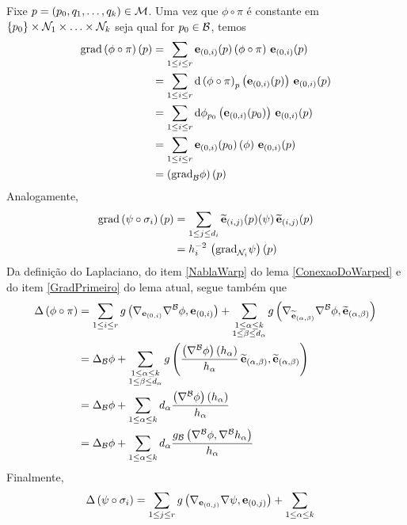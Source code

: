 \begin{demm}
Fixe $p = \left( p_0, q_1, \ldots, q_k  \right) \in \mathcal{M}$. Uma vez que $\phi \circ \pi$ é constante em $\{p_0 \} \times \mathcal{N}_1 \times \ldots \times \mathcal{N}_k$ seja qual for $p_0 \in \mathcal{B}$, temos
\begin{align*}
\text{grad}\left( \phi \circ \pi \right)(p) &= \sum_{1 \leq i \leq r} \mathbf{e}_{(0, i)}(p) \left( \phi \circ \pi \right) \, \mathbf{e}_{(0, i)}(p) \\
&= \sum_{1 \leq i \leq r} \mathrm{d} \left( \phi \circ \pi \right)_p \left( \mathbf{e}_{(0, i)}(p) \right) \, \mathbf{e}_{(0, i)}(p) \\
&=  \sum_{1 \leq i \leq r} \mathrm{d} \phi_{p_0}\left( \mathbf{e}_{(0, i)}(p_0) \right)  \, \mathbf{e}_{(0, i)}(p) \\ 
&=  \sum_{1 \leq i \leq r}  \mathbf{e}_{(0, i)}(p_0) \left( \phi \right) \, \mathbf{e}_{(0, i)}(p) \\
&= \left( \text{grad}_{\mathcal{B}} \phi \right) (p)
\end{align*}
Analogamente,
\begin{align*}
\text{grad}\left( \psi \circ \sigma_i \right)(p) &= \sum_{1 \leq j \leq d_i} \widetilde{\mathbf{e}}_{(i, j)}(p)(\psi) \, \widetilde{\mathbf{e}}_{(i, j)}(p) \\
&= h_{i}^{-2} \, \left( \text{grad}_{\mathcal{N}_i} \psi \right)(p)
\end{align*}
Da definição do Laplaciano, do item \ref{NablaWarp} do lema \cref{ConexaoDoWarped} e do item \ref{GradPrimeiro} do lema atual, segue também que
\begin{align*}
\Delta\left( \phi \circ \pi \right) &= \sum_{1 \leq i \leq r} g\left(  \nabla_{\mathbf{e}_{(0, i)}} \nabla^{\mathcal{B}} \phi, \mathbf{e}_{(0, i)}  \right) + \sum_{\substack{1 \leq \alpha \leq k \\
1 \leq \beta \leq d_{\alpha}}} g\left(  \nabla_{\widetilde{\mathbf{e}}_{(\alpha, \beta)}} \nabla^{\mathcal{B}} \phi, \widetilde{\mathbf{e}}_{(\alpha, \beta)}  \right) \\
&= \Delta_{\mathcal{B}} \phi + \sum_{\substack{1 \leq \alpha \leq k \\
1 \leq \beta \leq d_{\alpha}}} g\left(  \frac{\left( \nabla^{\mathcal{B}} \phi \right)\left( h_{\alpha} \right)}{h_{\alpha}} \, \widetilde{\mathbf{e}}_{(\alpha, \beta)} , \widetilde{\mathbf{e}}_{(\alpha, \beta)}  \right) \\
&= \Delta_{\mathcal{B}} \phi + \sum_{1 \leq \alpha \leq k} d_{\alpha} \frac{\left( \nabla^{\mathcal{B}} \phi \right)\left( h_{\alpha} \right)}{h_{\alpha}} \\
&=\Delta_{\mathcal{B}} \phi + \sum_{1 \leq \alpha \leq k} d_{\alpha} \frac{g_{\mathcal{B}} \left( \nabla^{\mathcal{B}} \phi, \nabla^{\mathcal{B}} h_{\alpha} \right)}{h_{\alpha}}
\end{align*}
Finalmente,
\begin{align*}
\Delta\left(  \psi \circ \sigma_i \right) &= \sum_{1 \leq j \leq r} g\left(  \nabla_{\mathbf{e}_{(0, j)}} \nabla \psi, \mathbf{e}_{(0, j)}  \right) + \sum_{\substack{1 \leq \alpha \leq k \\
}}
\end{align*}
\end{demm}
